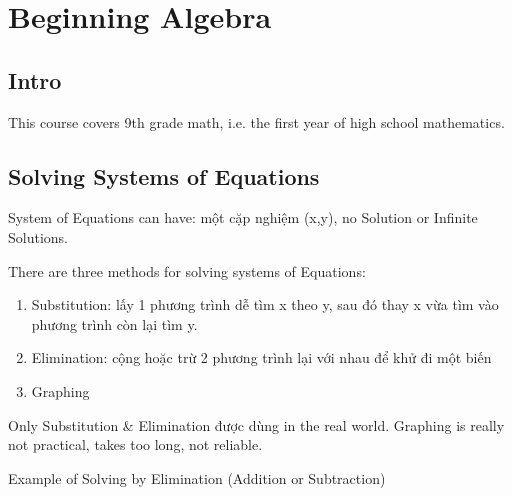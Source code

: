 \chapter{Beginning Algebra}

\section{Intro}

This course covers 9th grade math, i.e. the first year of high school mathematics.

\section{Solving Systems of Equations}

%
%

System of Equations can have: một cặp nghiệm (x,y), no Solution or Infinite Solutions.

\vspace{.4cm}

There are three methods for solving systems of Equations:

\begin{enumerate}
  \item Substitution: lấy 1 phương trình dễ tìm x theo y, sau đó thay x vừa tìm vào phương trình còn lại tìm y.
  \item Elimination: cộng hoặc trừ 2 phương trình lại với nhau để khử đi một biến
  \item Graphing
\end{enumerate}

Only Substitution \& Elimination được dùng in the real world. Graphing is really not practical, takes too long, not reliable.


Example of Solving by Elimination (Addition or Subtraction)

